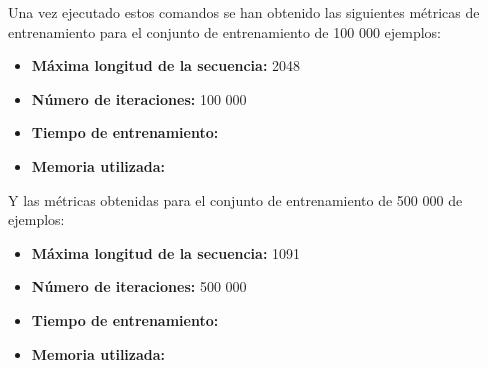 Una vez ejecutado estos comandos se han obtenido las siguientes métricas de entrenamiento
para el conjunto de entrenamiento de 100 000 ejemplos:

\begin{itemize}
    \item \textbf{Máxima longitud de la secuencia:} 2048
    \item \textbf{Número de iteraciones:} 100 000
    \item \textbf{Tiempo de entrenamiento:}
    \item \textbf{Memoria utilizada:}
\end{itemize}

Y las métricas obtenidas para el conjunto de entrenamiento de 500 000 de ejemplos:

\begin{itemize}
    \item \textbf{Máxima longitud de la secuencia:} 1091
    \item \textbf{Número de iteraciones:} 500 000
    \item \textbf{Tiempo de entrenamiento:}
    \item \textbf{Memoria utilizada:}
\end{itemize}
